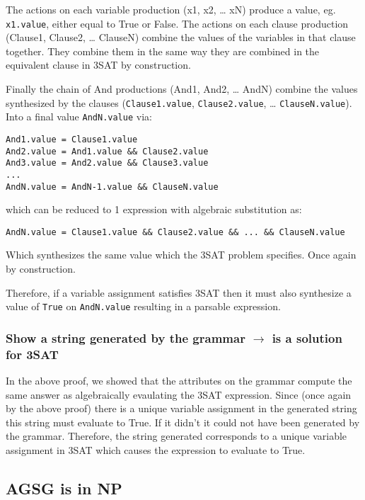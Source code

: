 The actions on each variable production (x1, x2, \ldots{} xN) produce a
value, eg. \verb!x1.value!, either equal to True or False. The actions
on each clause production (Clause1, Clause2, \ldots{} ClauseN) combine
the values of the variables in that clause together. They combine them
in the same way they are combined in the equivalent clause in 3SAT by
construction.

Finally the chain of And productions (And1, And2, \ldots{} AndN) combine
the values synthesized by the clauses (\verb!Clause1.value!,
\verb!Clause2.value!, \ldots{} \verb!ClauseN.value!). Into a final value
\verb!AndN.value! via:

\begin{verbatim}
And1.value = Clause1.value
And2.value = And1.value && Clause2.value
And3.value = And2.value && Clause3.value
...
AndN.value = AndN-1.value && ClauseN.value
\end{verbatim}
which can be reduced to 1 expression with algebraic substitution as:

\begin{verbatim}
AndN.value = Clause1.value && Clause2.value && ... && ClauseN.value
\end{verbatim}
Which synthesizes the same value which the 3SAT problem specifies. Once
again by construction.

Therefore, if a variable assignment satisfies 3SAT then it must also
synthesize a value of \verb!True! on \verb!AndN.value! resulting in a
parsable expression.

\subsubsection{Show a string generated by the grammar $\rightarrow$
is a solution for 3SAT}

In the above proof, we showed that the attributes on the grammar compute
the same answer as algebraically evaulating the 3SAT expression. Since
(once again by the above proof) there is a unique variable assignment in
the generated string this string must evaluate to True. If it didn't it
could not have been generated by the grammar. Therefore, the string
generated corresponds to a unique variable assignment in 3SAT which
causes the expression to evaluate to True.

\subsection{AGSG is in NP}


